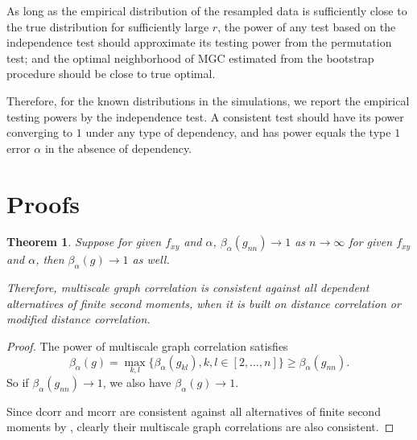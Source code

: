 \documentclass[11pt]{article}
\newtheorem{thm}{Theorem}
\begin{document}
As long as the empirical distribution of the resampled data is sufficiently close to the true distribution for sufficiently large $r$, the power of any test based on the independence test should approximate its testing power from the permutation test; and the optimal neighborhood of MGC estimated from the bootstrap procedure should be close to true optimal.

Therefore, for the known distributions in the simulations, we report the empirical testing powers by the independence test. A consistent test should have its power converging to $1$ under any type of dependency, and has power equals the type $1$ error $\alpha$ in the absence of dependency.  

\section{Proofs}
\label{sec:pfs}


\begin{thm}
Suppose for given $f_{xy}$ and $\alpha$, $\beta_{\alpha}(g_{nn}) \rightarrow 1$ as $n \rightarrow \infty$ for given $f_{xy}$ and $\alpha$, then $\beta_{\alpha}(g) \rightarrow 1$ as well.

Therefore, multiscale graph correlation is consistent against all dependent alternatives of finite second moments, when it is built on distance correlation or modified distance correlation.
\end{thm}
\begin{proof}
The power of multiscale graph correlation satisfies
\begin{equation}
\beta_{\alpha}(g)=\max_{k,l}\{\beta_{\alpha}(g_{kl}), k,l\in [2,\ldots,n]\} \geq \beta_{\alpha}(g_{nn}).
\end{equation}
So if $\beta_{\alpha}(g_{nn}) \rightarrow 1$, we also have $\beta_{\alpha}(g) \rightarrow 1$.

Since dcorr and mcorr are consistent against all alternatives of finite second moments by \cite{SzekelyRizzoBakirov2007, SzekelyRizzo2013a}, clearly their multiscale graph correlations are also consistent.
\end{proof}
\end{document}
